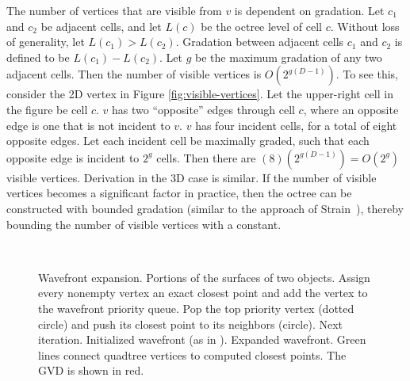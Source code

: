 \documentclass{egpubl}
\begin{document}
The number of vertices that are visible from $v$ is dependent on gradation.  Let $c_1$ and $c_2$ be adjacent cells, and let $L(c)$ be the octree level of cell $c$.  Without loss of generality, let $L(c_1) > L(c_2)$.  Gradation between adjacent cells $c_1$ and $c_2$ is defined to be $L(c_1) - L(c_2)$.  Let $g$ be the maximum gradation of any two adjacent cells.  Then the number of visible vertices is $O(2^{g(D-1)})$.  To see this, consider the 2D vertex in Figure \ref{fig:visible-vertices}.  Let the upper-right cell in the figure be cell $c$.  $v$ has two ``opposite'' edges through cell $c$, where an opposite edge is one that is not incident to $v$.  $v$ has four incident cells, for a total of eight opposite edges.  Let each incident cell be maximally graded, such that each opposite edge is incident to $2^g$ cells.  Then there are $(8)(2^{g(D-1)}) = O(2^g)$ visible vertices.  Derivation in the 3D case is similar.  If the number of visible vertices becomes a significant factor in practice, then the octree can be constructed with bounded gradation (similar to the approach of Strain~), thereby bounding the number of visible vertices with a constant.

\begin{figure}
  \centering
   \\
  \caption{Wavefront expansion.
    \protect{} Portions of the surfaces of two objects. Assign every nonempty vertex an exact closest point and add the vertex to the wavefront priority queue.
    \protect{} Pop the top priority vertex (dotted circle) and push its closest point to its neighbors (circle).
    \protect{} Next iteration.
    \protect{} Initialized wavefront (as in \protect{}).
    \protect{} Expanded wavefront.  Green lines connect quadtree vertices to computed closest points.
    \protect{} The GVD is shown in red.
  }
  \label{fig:wavefront}
\end{figure}
\end{document}
